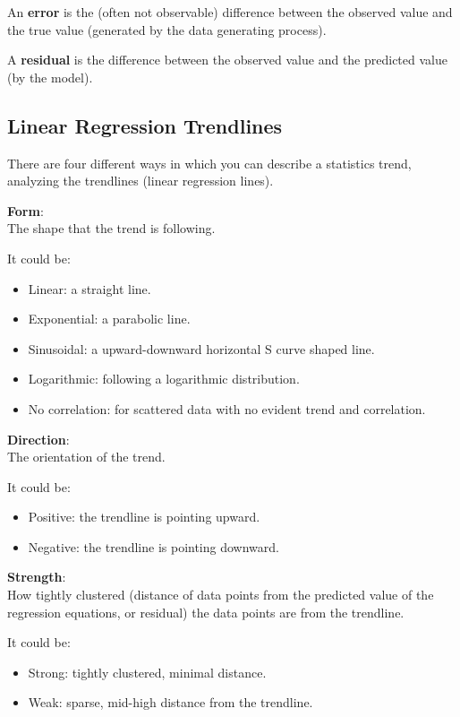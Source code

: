 \documentclass{article}
\begin{document}
An \textbf{error} is the (often not observable) difference between the observed value and the true value (generated by the data generating process).

A \textbf{residual} is the difference between the observed value and the predicted value (by the model). 

\subsection{Linear Regression Trendlines}
There are four different ways in which you can describe a statistics trend, analyzing the trendlines (linear regression lines).

\textbf{Form}: \\
The shape that the trend is following. 

It could be: 
\begin{itemize}
    \item Linear: a straight line.
    \item Exponential: a parabolic line.
    \item Sinusoidal: a upward-downward horizontal S curve shaped line.
    \item Logarithmic: following a logarithmic distribution.
    \item No correlation: for scattered data with no evident trend and correlation.
\end{itemize}
 
\textbf{Direction}: \\
The orientation of the trend.

It could be:
\begin{itemize}
    \item Positive: the trendline is pointing upward.
    \item Negative: the trendline is pointing downward.
\end{itemize}

\textbf{Strength}: \\ 
How tightly clustered (distance of data points from the predicted value of the regression equations, or residual) the data points are from the trendline.

It could be:
\begin{itemize}
    \item Strong: tightly clustered, minimal distance.
    \item Weak: sparse, mid-high distance from the trendline. 
\end{itemize}
\end{document}

